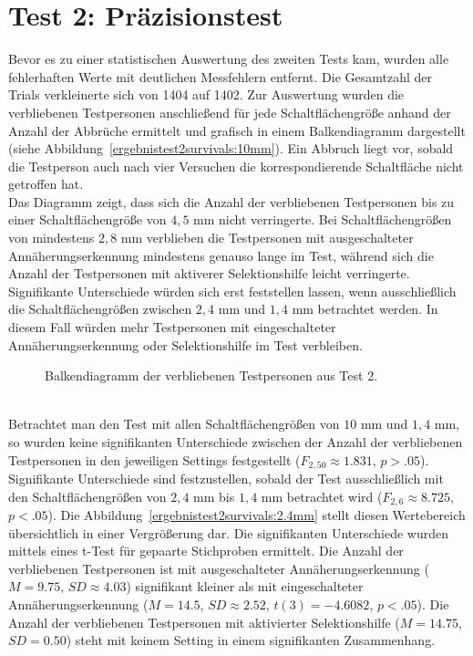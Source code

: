 \documentclass[12pt,numbers=noenddot,parskip,bibliography=totocnumbered,listof=totocnumbered]{scrreprt}
\begin{document}
\section{Test 2: Präzisionstest}
Bevor es zu einer statistischen Auswertung des zweiten Tests kam, wurden alle fehlerhaften Werte mit deutlichen Messfehlern entfernt. Die Gesamtzahl der Trials verkleinerte sich von 1404 auf 1402. Zur Auswertung wurden die verbliebenen Testpersonen anschließend für jede Schaltflächengröße anhand der Anzahl der Abbrüche ermittelt und grafisch in einem Balkendiagramm dargestellt (siehe Abbildung~\ref{ergebnistest2survivals:10mm}). Ein Abbruch liegt vor, sobald die Testperson auch nach vier Versuchen die korrespondierende Schaltfläche nicht getroffen hat.\\
Das Diagramm zeigt, dass sich die Anzahl der verbliebenen Testpersonen bis zu einer Schaltflächengröße von $4{,}5$ mm nicht verringerte. Bei Schaltflächengrößen von mindestens $2{,}8$ mm verblieben die Testpersonen mit ausgeschalteter Annäherungserkennung mindestens genauso lange im Test, während sich die Anzahl der Testpersonen mit aktiverer Selektionshilfe leicht verringerte. Signifikante Unterschiede würden sich erst feststellen lassen, wenn ausschließlich die Schaltflächengrößen zwischen $2{,}4$ mm und $1{,}4$ mm betrachtet werden. In diesem Fall würden mehr Testpersonen mit eingeschalteter Annäherungserkennung oder Selektionshilfe im Test verbleiben.
\begin{figure}
\centering
{}
\vfill
{}
\caption{Balkendiagramm der verbliebenen Testpersonen aus Test 2.}
\label{ergebnistest2survivals}
\end{figure}\\
Betrachtet man den Test mit allen Schaltflächengrößen von $10$ mm und $1{,}4$ mm, so wurden keine signifikanten Unterschiede zwischen der Anzahl der verbliebenen Testpersonen in den jeweiligen Settings festgestellt ($F_{2,50}\approx 1.831$, $p > .05$). Signifikante Unterschiede sind festzustellen, sobald der Test ausschließlich mit den Schaltflächengrößen von $2{,}4$ mm bis $1{,}4$ mm betrachtet wird ($F_{2,6}\approx 8.725$, $p < .05$). Die Abbildung~\ref{ergebnistest2survivals:2.4mm} stellt diesen Wertebereich übersichtlich in einer Vergrößerung dar. Die signifikanten Unterschiede wurden mittels eines t-Test für gepaarte Stichproben ermittelt. Die Anzahl der verbliebenen Testpersonen ist mit ausgeschalteter Annäherungserkennung ($M = 9.75$, $SD\approx 4.03$) signifikant kleiner als mit eingeschalteter Annäherungserkennung ($M = 14.5$, $SD\approx 2.52$, $t(3) = -4.6082$, $p < .05$). Die Anzahl der verbliebenen Testpersonen mit aktivierter Selektionshilfe ($M = 14.75$, $SD = 0.50$) steht mit keinem Setting in einem signifikanten Zusammenhang.
\end{document}
